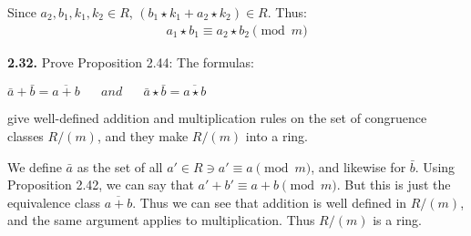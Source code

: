 \documentclass[11pt,fleqn]{article}
\begin{document}
Since $a_2, b_1, k_1, k_2 \in R$, $(b_1 \star k_1 + a_2 \star k_2) \in R$.  Thus:
\begin{align}
a_1 \star b_1 \equiv a_2 \star b_2 \pmod{m}\nonumber
\end{align}

\begin{flushleft}
\textbf{2.32.} Prove Proposition 2.44: The formulas:
\begin{center}
$\bar{a} + \bar{b} = \overline{a + b}\;\;\; \;\;\; and \;\;\;\;\;\; \bar{a} \star \bar{b} = \overline{a \star b}$
\end{center}
give well-defined addition and multiplication rules on the set of congruence classes $R/(m)$, and they make $R/(m)$ into a ring.
\end{flushleft}

We define $\bar{a}$ as the set of all $a' \in R \ni a' \equiv a \pmod{m}$, and likewise for $\bar{b}$. Using Proposition 2.42, we can say that $a' + b' \equiv a + b \pmod{m}$. But this is just the equivalence class $\overline{a+b}$. Thus we can see that addition is well defined in $R/(m)$, and the same argument applies to multiplication. Thus $R/(m)$ is a ring.  
\end{document}
